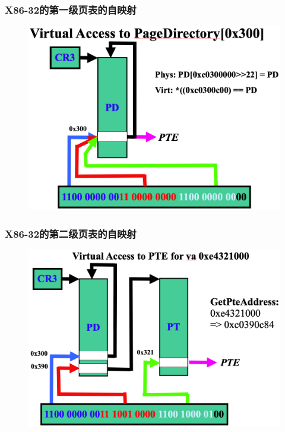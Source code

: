 % 
% 
\begin{frame}
    \frametitle{X86-32的第一级页表的自映射}
    \begin{figure}
    \includegraphics[width=0.63\linewidth]{figs/1-level-self-mapping-pt.png}
    \end{figure}
\end{frame}
% 
\begin{frame}
    \frametitle{X86-32的第二级页表的自映射}
    \begin{figure}
    \includegraphics[width=0.63\linewidth]{figs/2-level-self-mapping-pt.png}
    \end{figure}
\end{frame}
